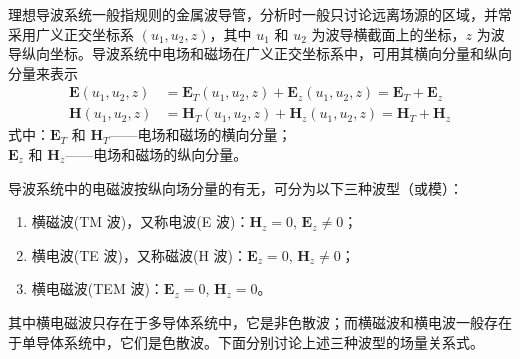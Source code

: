 理想导波系统一般指规则的金属波导管，分析时一般只讨论远离场源的区域，并常采用广义正交坐标系 $(u_1, u_2, z)$，其中 $u_1$ 和 $u_2$ 为波导横截面上的坐标，$z$ 为波导纵向坐标。导波系统中电场和磁场在广义正交坐标系中，可用其横向分量和纵向分量来表示
\begin{align*}
	\mathbf{E}(u_1, u_2, z) &= \mathbf{E}_T(u_1, u_2, z) + \mathbf{E}_z(u_1, u_2, z) = \mathbf{E}_T + \mathbf{E}_z 
	\tag{3-3-1}
	\\
	\mathbf{H}(u_1, u_2, z) &= \mathbf{H}_T(u_1, u_2, z) + \mathbf{H}_z(u_1, u_2, z) = \mathbf{H}_T + \mathbf{H}_z
	\tag{3-3-2}
\end{align*}
式中：$\mathbf{E}_T$ 和 $\mathbf{H}_T$——电场和磁场的横向分量；\\
$\mathbf{E}_z$ 和 $\mathbf{H}_z$——电场和磁场的纵向分量。

导波系统中的电磁波按纵向场分量的有无，可分为以下三种波型（或模）：
\begin{enumerate}
	\item 横磁波(TM 波)，又称电波(E 波)：$\mathbf{H}_z = 0$, $\mathbf{E}_z \neq 0$；
	\item 横电波(TE 波)，又称磁波(H 波)：$\mathbf{E}_z = 0$, $\mathbf{H}_z \neq 0$；
	\item 横电磁波(TEM 波)：$\mathbf{E}_z = 0$, $\mathbf{H}_z = 0$。
\end{enumerate}

其中横电磁波只存在于多导体系统中，它是非色散波；而横磁波和横电波一般存在于单导体系统中，它们是色散波。下面分别讨论上述三种波型的场量关系式。


